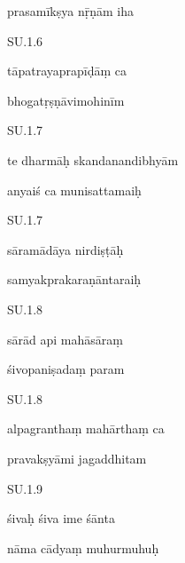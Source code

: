 \documentclass{article}
\begin{document}
	    
		prasamīkṣya nṝṇām iha 
    

    
	
	    
		SU.1.6 
    
	    
		tāpatrayaprapīḍāṃ ca 
    
	    
		bhogatṛṣṇāvimohinīm 
    

    
	
	    
		SU.1.7 
    
	    
		te dharmāḥ skandanandibhyām 
    
	    
		anyaiś ca munisattamaiḥ 
    

    
	
	    
		SU.1.7 
    
	    
		sāramādāya nirdiṣṭāḥ 
    
	    
		samyakprakaraṇāntaraiḥ 
    

    
	
	    
		SU.1.8 
    
	    
		sārād api mahāsāraṃ 
    
	    
		śivopaniṣadaṃ param 
    

    
	
	    
		SU.1.8 
    
	    
		alpagranthaṃ mahārthaṃ ca 
    
	    
		pravakṣyāmi jagaddhitam 
    

    
	
	    
		SU.1.9 
    
	    
		śivaḥ śiva ime śānta 
    
	    
		nāma cādyaṃ muhurmuhuḥ 
    

    
	
\end{document}
